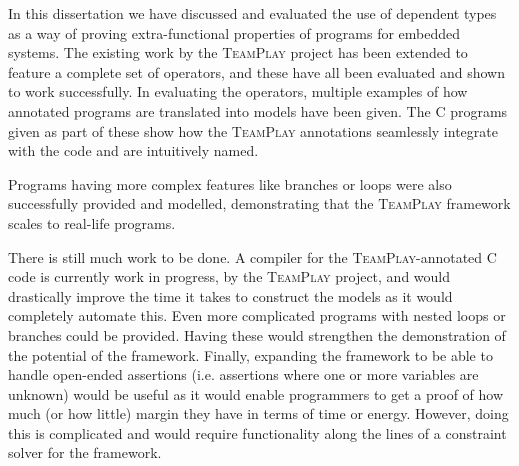In this dissertation we have discussed and evaluated the use of dependent types as a way of proving extra-functional properties of programs for embedded systems. The existing work by the \textsc{TeamPlay} project has been extended to feature a complete set of operators, and these have all been evaluated and shown to work successfully. In evaluating the operators, multiple examples of how annotated programs are translated into \Idris models have been given. The C programs given as part of these show how the \textsc{TeamPlay} annotations seamlessly integrate with the code and are intuitively named.

Programs having more complex features like branches or loops were also successfully provided and modelled, demonstrating that the \textsc{TeamPlay} framework scales to real-life programs.

There is still much work to be done. A compiler for the \textsc{TeamPlay}-annotated C code is currently work in progress, by the \textsc{TeamPlay} project, and would drastically improve the time it takes to construct the \Idris models as it would completely automate this. Even more complicated programs with nested loops or branches could be provided. Having these would strengthen the demonstration of the potential of the framework. Finally, expanding the framework to be able to handle open-ended assertions (i.e. assertions where one or more variables are unknown) would be useful as it would enable programmers to get a proof of how much (or how little) margin they have in terms of time or energy. However, doing this is complicated and would require functionality along the lines of a constraint solver for the framework.
